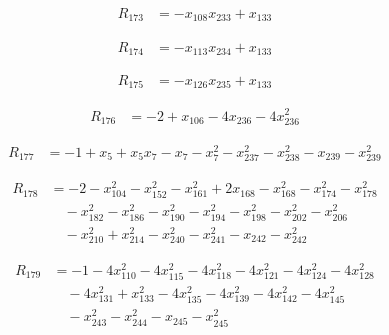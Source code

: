 \begin{align*}
R_{173} &= -x_{108} x_{233} +x_{133}
\end{align*}

\begin{align*}
R_{174} &= -x_{113} x_{234} +x_{133}
\end{align*}

\begin{align*}
R_{175} &= -x_{126} x_{235} +x_{133}
\end{align*}

\begin{align*}
R_{176} &= -2 +x_{106} -4 x_{236} -4 x_{236}^{2}
\end{align*}

\begin{align*}
R_{177} &= -1 +x_{5} +x_{5} x_{7} -x_{7} -x_{7}^{2} -x_{237}^{2} -x_{238}^{2} -x_{239} -x_{239}^{2}
\end{align*}

\begin{align*}
R_{178} &= -2 -x_{104}^{2} -x_{152}^{2} -x_{161}^{2} +2 x_{168} -x_{168}^{2} -x_{174}^{2} -x_{178}^{2} \\
&\quad -x_{182}^{2} -x_{186}^{2} -x_{190}^{2} -x_{194}^{2} -x_{198}^{2} -x_{202}^{2} -x_{206}^{2} \\
&\quad -x_{210}^{2} +x_{214}^{2} -x_{240}^{2} -x_{241}^{2} -x_{242} -x_{242}^{2}
\end{align*}

\begin{align*}
R_{179} &= -1 -4 x_{110}^{2} -4 x_{115}^{2} -4 x_{118}^{2} -4 x_{121}^{2} -4 x_{124}^{2} -4 x_{128}^{2} \\
&\quad -4 x_{131}^{2} +x_{133}^{2} -4 x_{135}^{2} -4 x_{139}^{2} -4 x_{142}^{2} -4 x_{145}^{2} \\
&\quad -x_{243}^{2} -x_{244}^{2} -x_{245} -x_{245}^{2}
\end{align*}
